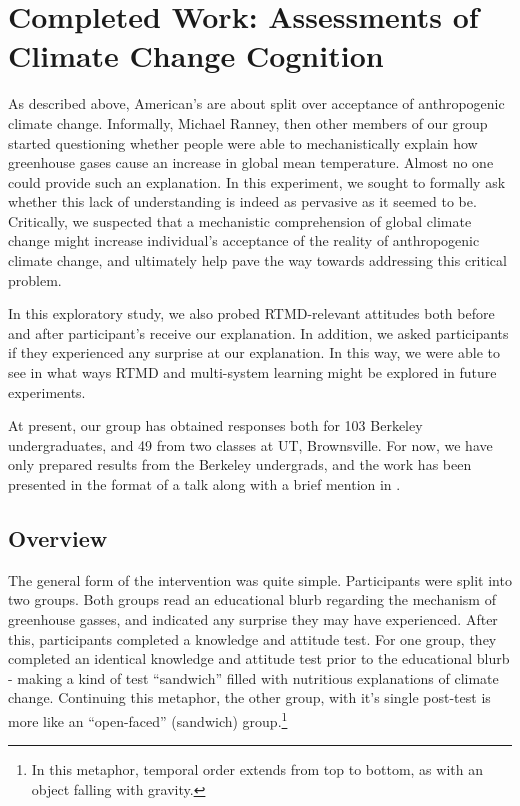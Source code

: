 \graphicspath{{assessments-of-ccc/}}

\chapter{Completed Work: Assessments of Climate Change Cognition}
\label{chap:ccc}

As described above, American's are about split over acceptance of anthropogenic
climate change. Informally, Michael Ranney, then other members of our group
started questioning whether people were able to mechanistically explain how
greenhouse gases cause an increase in global mean temperature. Almost no one
could provide such an explanation. In this experiment, we sought to formally ask
whether this lack of understanding is indeed as pervasive as it seemed to be.
Critically, we suspected that a mechanistic comprehension of global climate
change might increase individual's acceptance of the reality of anthropogenic
climate change, and ultimately help pave the way towards addressing this
critical problem.

In this exploratory study, we also probed RTMD-relevant attitudes both
before and after participant's receive our explanation. In addition, we asked
participants if they experienced any surprise at our explanation. In this way,
we were able to see in what ways RTMD and multi-system learning might be
explored in future experiments.


At present, our group has obtained responses both for 103 Berkeley
undergraduates, and 49 from two classes at UT, Brownsville. For now, we have
only prepared results from the Berkeley undergrads, and the work has been
presented in the format of a talk along with a brief mention in
.  

\section{Overview}

The general form of the intervention was quite simple. Participants were split
into two groups. Both groups read an educational blurb regarding the mechanism
of greenhouse gasses, and indicated any surprise they may have experienced.
After this, participants completed a knowledge and attitude test. For one group,
they completed an identical knowledge and attitude test prior to the educational
blurb - making a kind of test ``sandwich'' filled with nutritious explanations
of climate change. Continuing this metaphor, the other group, with it's single
post-test is more like an ``open-faced'' (sandwich) group.\footnote{In this
    metaphor, temporal order extends from top to bottom, as with an object
    falling with gravity.}

